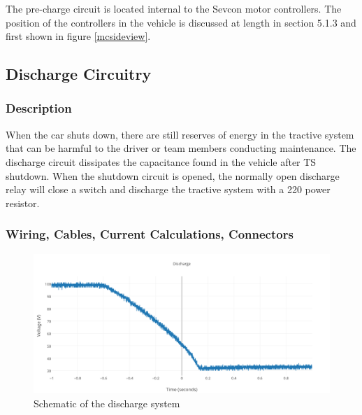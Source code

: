 \documentclass{article}
\begin{document}
            The pre-charge circuit is located internal to the Sevcon motor controllers. The position of the controllers in the vehicle is discussed at length in section 5.1.3 and first shown in figure \ref{mcsideview}.

    \subsection{Discharge Circuitry}
    \label{dischargesection}

        \subsubsection{Description}

            When the car shuts down, there are still reserves of energy in the tractive system that can be harmful to the driver or team members conducting maintenance. The discharge circuit dissipates the capacitance found in the vehicle after TS shutdown. When the shutdown circuit is opened, the normally open discharge relay will close a switch and discharge the tractive system with a 220 \ohm  power resistor. 

        \subsubsection{Wiring, Cables, Current Calculations, Connectors}

            
            \begin{figure}[H]
                \centering
                \includegraphics{discharge}
                \caption{Schematic of the discharge system}
                \label{dischargeschem}
            \end{figure}
            
\end{document}
